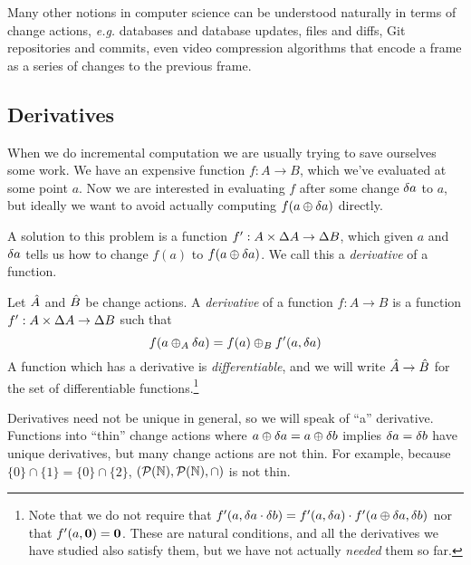 Many other notions in computer science can be understood naturally in terms of change actions,
\emph{e.g.} databases and database updates, files and diffs, Git repositories and commits, even 
video compression algorithms that encode a frame as a series of changes to the previous frame.

\subsection{Derivatives}

When we do incremental computation we are usually trying to save ourselves some
work. We have an expensive function $f: A \rightarrow B$, which we've evaluated at some point
$a$. Now we are interested in evaluating $f$ after some change $\delta a$ to
$a$, but ideally we want to avoid actually computing $f(a \oplus
\delta a)$ directly.

A solution to this problem is a function $f': A \times \Delta A
\rightarrow \Delta B$, which given $a$ and $\delta a$ tells us how to change
$f(a)$ to $f(a \oplus \delta a)$. We call this a \emph{derivative} of a function.

\begin{defn}
  \label{def:derivative}
  Let $\hat{A}$ and $\hat{B}$ be change actions.
  A \emph{derivative} of a function $f: A \rightarrow B$ is a function $f': A \times \Delta A \rightarrow
  \Delta B$ such that
  \begin{displaymath}
    f(a \oplus_A \delta a) = f(a) \oplus_B f'(a, \delta a)
  \end{displaymath}
  A function which has a derivative is 
  \emph{differentiable}, and we will write $\hat{A} \rightarrow \hat{B}$ for
  the set of differentiable functions.\footnote{Note that we do not require that $f'(a,
    \delta a \cdot \delta b) = f'(a, \delta a) \cdot f'(a
    \oplus \delta a, \delta b)$ nor that $f'(a, \mathbf{0}) = \mathbf{0}$.
    These are natural conditions, and all the 
    derivatives we have studied also satisfy them, but we have not actually
    \emph{needed} them so far.}
\end{defn}

Derivatives need not be unique in general, so we will speak of ``a''
derivative. Functions into ``thin'' change
actions \textemdash{} where $a \oplus \delta a = a \oplus \delta b$ implies $\delta a =
\delta b$ \textemdash{} have unique derivatives, but many change actions are not thin.
For example, because $\{0\} \cap \{1\} = \{0\}
\cap \{2\}$, $(\mathcal{P}(\mathbb{N}),\mathcal{P}(\mathbb{N}),\cap)$ is not thin.

